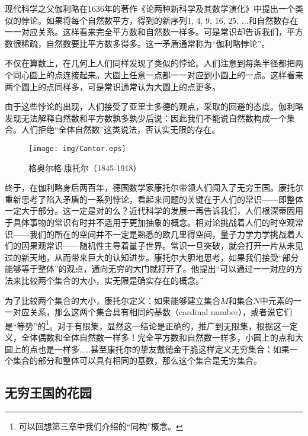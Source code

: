 \documentclass{article}
\begin{document}
现代科学之父伽利略在1636年的著作《论两种新科学及其数学演化》中提出一个类似的悖论。如果将每个自然数平方，得到的新序列1, 4, 9, 16, 25, ...和自然数存在一一对应关系。这样看来完全平方数和自然数一样多。可是常识却告诉我们，平方数很稀疏，自然数要比平方数多得多。这一矛盾通常称为“伽利略悖论”。

不仅在算数上，在几何上人们同样发现了类似的悖论。人们注意到每条半径都把两个同心圆上的点连接起来。大圆上任意一点都一一对应到小圆上的一点。这样看来两个圆上的点同样多，可是常识通常认为大圆上的点更多。

由于这些悖论的出现，人们接受了亚里士多德的观点，采取的回避的态度。伽利略发现无法解释自然数和平方数孰多孰少后说：因此我们不能说自然数构成一个集合。人们拒绝“全体自然数”这类说法，否认实无限的存在。

\begin{wrapfigure}{R}{0.4\textwidth}
 \centering
 \texttt{[image: img/Cantor.eps]}
 \captionsetup{labelformat=empty}
 \caption{格奥尔格$\cdot$康托尔（1845-1918）}
 \label{fig:Cantor}
\end{wrapfigure}

终于，在伽利略身后两百年，德国数学家康托尔带领人们闯入了无穷王国。康托尔重新思考了陷入矛盾的一系列悖论，看起来问题的关键在于人们的常识——即整体一定大于部分。这一定是对的么？近代科学的发展一再告诉我们，人们根深蒂固用于具体事物的常识有时并不适用于更加抽象的概念。相对论挑战着人们的时空观常识——我们的所在的空间并不一定是熟悉的欧几里得空间，量子力学力学挑战着人们的因果观常识——随机性主导着量子世界。常识一旦突破，就会打开一片从未见过的新天地，从而带来巨大的认知进步。康托尔大胆地思考，如果我们接受“部分能够等于整体”的观点，通向无穷的大门就打开了。他提出“可以通过一一对应的方法来比较两个集合的大小，实无限是确实存在的概念。”

为了比较两个集合的大小，康托尔定义：如果能够建立集合$M$和集合$N$中元素的一一对应关系，那么这两个集合具有相同的基数（cardinal number），或者说它们是“等势”的\footnote{可以回想第三章中我们介绍的“同构”概念。}。对于有限集，显然这一结论是正确的，推广到无限集，根据这一定义，全体偶数和全体自然数一样多！完全平方数和自然数一样多，小圆上的点和大圆上的点也是一样多……甚至康托尔的挚友戴徳金干脆这样定义无穷集合：如果一个集合的部分和整体可以具有相同的基数，那么这个集合是无穷集合。

\subsection{无穷王国的花园}
\end{document}
